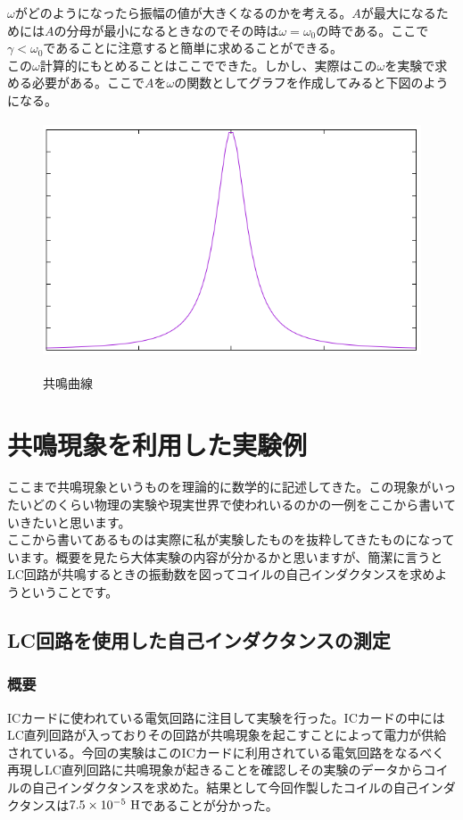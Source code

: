$\omega$がどのようになったら振幅の値が大きくなるのかを考える。$A$が最大になるためには$A$の分母が最小になるときなのでその時は$\omega = \omega_0$の時である。ここで$\gamma<\omega_0$であることに注意すると簡単に求めることができる。\\
この$\omega$計算的にもとめることはここでできた。しかし、実際はこの$\omega$を実験で求める必要がある。ここで$Aを\omega$の関数としてグラフを作成してみると下図のようになる。
\begin{figure}[H]
\centering
\includegraphics[height=7cm,clip]{kadono/image/reso.png}
\label{fig:reso}
\caption{共鳴曲線}
\end{figure}

\newpage

\chapter{共鳴現象を利用した実験例}
ここまで共鳴現象というものを理論的に数学的に記述してきた。この現象がいったいどのくらい物理の実験や現実世界で使われいるのかの一例をここから書いていきたいと思います。\\
ここから書いてあるものは実際に私が実験したものを抜粋してきたものになっています。概要を見たら大体実験の内容が分かるかと思いますが、簡潔に言うとLC回路が共鳴するときの振動数を図ってコイルの自己インダクタンスを求めようということです。
\begin{center}
\section*{LC回路を使用した自己インダクタンスの測定}
\end{center}
\subsection*{概要}
ICカードに使われている電気回路に注目して実験を行った。ICカードの中にはLC直列回路が入っておりその回路が共鳴現象を起こすことによって電力が供給されている。今回の実験はこのICカードに利用されている電気回路をなるべく再現しLC直列回路に共鳴現象が起きることを確認しその実験のデータからコイルの自己インダクタンスを求めた。結果として今回作製したコイルの自己インダクタンスは$7.5\times 10^{-5}\ {\rm H}$であることが分かった。


